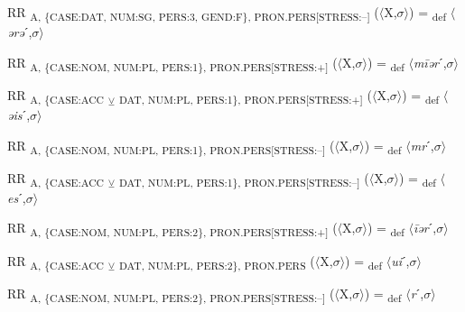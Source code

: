 {\begin{exe}
 RR \textsubscript{A, \{CASE:DAT, NUM:SG, PERS:3, GEND:F\}, PRON.PERS[STRESS:–]} ($\langle$X,$\sigma $$\rangle$) = \textsubscript{def} $\langle$\textit{ərə}ˊ,$\sigma $$\rangle$
\end{exe}

\begin{exe}
 RR \textsubscript{A, \{CASE:NOM, NUM:PL, PERS:1\}, PRON.PERS[STRESS:+]} ($\langle$X,$\sigma $$\rangle$) = \textsubscript{def} $\langle$\textit{m\=iər}ˊ,$\sigma $$\rangle$
\end{exe}

\begin{exe}
 RR \textsubscript{A, \{CASE:ACC} \textsubscript{${\veebar}$}\textsubscript{ DAT, NUM:PL, PERS:1\}, PRON.PERS[STRESS:+]} ($\langle$X,$\sigma $$\rangle$) = \textsubscript{def} $\langle$\textit{əis}ˊ,$\sigma $$\rangle$
\end{exe}

\begin{exe}
 RR \textsubscript{A, \{CASE:NOM, NUM:PL, PERS:1\}, PRON.PERS[STRESS:–]} ($\langle$X,$\sigma $$\rangle$) = \textsubscript{def} $\langle$\textit{mr}ˊ,$\sigma $$\rangle$
\end{exe}

\begin{exe}
 RR \textsubscript{A, \{CASE:ACC} \textsubscript{${\veebar}$}\textsubscript{ DAT, NUM:PL, PERS:1\}, PRON.PERS[STRESS:–]} ($\langle$X,$\sigma $$\rangle$) = \textsubscript{def} $\langle$\textit{es}ˊ,$\sigma $$\rangle$
\end{exe}

\begin{exe}
 RR \textsubscript{A, \{CASE:NOM, NUM:PL, PERS:2\}, PRON.PERS[STRESS:+]} ($\langle$X,$\sigma $$\rangle$) = \textsubscript{def} $\langle$\textit{\=iər}ˊ,$\sigma $$\rangle$
\end{exe}

\begin{exe}
 RR \textsubscript{A, \{CASE:ACC} \textsubscript{${\veebar}$}\textsubscript{ DAT, NUM:PL, PERS:2\}, PRON.PERS} ($\langle$X,$\sigma $$\rangle$) = \textsubscript{def} $\langle$\textit{ui}ˊ,$\sigma $$\rangle$
\end{exe}

\begin{exe}
 RR \textsubscript{A, \{CASE:NOM, NUM:PL, PERS:2\}, PRON.PERS[STRESS:–]} ($\langle$X,$\sigma $$\rangle$) = \textsubscript{def} $\langle$\textit{r}ˊ,$\sigma $$\rangle$
\end{exe}

}
